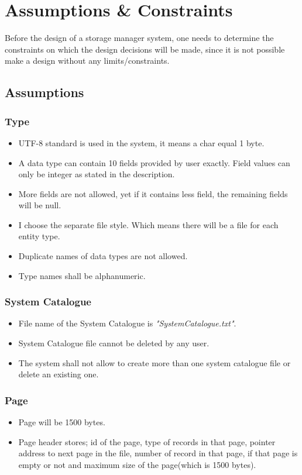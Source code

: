 \documentclass{article}
\begin{document}
        
    
\section{Assumptions \& Constraints}
Before the design of a storage manager system, one needs to determine the constraints on which the design decisions will be made, since it is not possible make a design without any limits/constraints.
    \subsection{Assumptions}
        \subsubsection{Type}
            \begin{itemize}
                \item UTF-8 standard is used in the system, it means a char equal 1 byte.
                \item A data type can contain 10 fields provided by user exactly. Field values can only be integer as stated in the description.
                \item More fields are not allowed, yet if it contains less field, the remaining fields will be null.
                \item I choose the separate file style. Which means there will be a file for each entity type.
                \item Duplicate names of data types are not allowed.
                \item Type names shall be alphanumeric.
            \end{itemize}
        \subsubsection{System Catalogue}
            \begin{itemize}
                \item File name of the System Catalogue is \emph{"SystemCatalogue.txt"}.
                \item System Catalogue file cannot be deleted by any user.
                \item The system shall not allow to create more than one system catalogue file or delete an existing one.
            \end{itemize}
        \subsubsection{Page}
             \begin{itemize}
                \item Page will be 1500 bytes.
                \item Page header stores; id of the page, type of records in that page, pointer address to next page in the file, number of record in that page, if that page is empty or not and maximum size of the page(which is 1500 bytes).
            \end{itemize}
\end{document}
